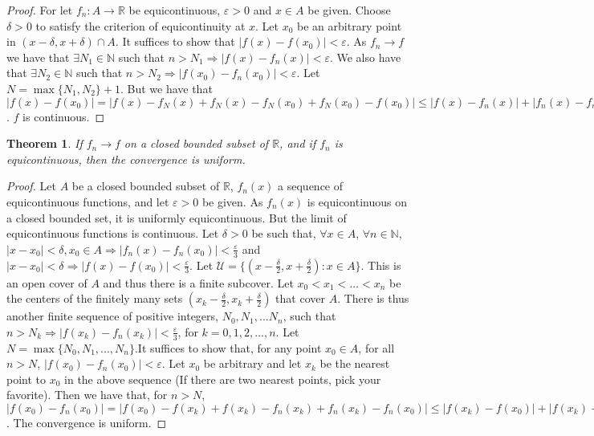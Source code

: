 \documentclass[crop=false,class=book]{standalone}
\theoremstyle{mystyle}
\newtheorem{theorem}{Theorem}[section]
\begin{document}
\begin{proof}
For let $f_n:A\rightarrow \mathbb{R}$ be equicontinuous, $\varepsilon>0$ and $x\in A$ be given. Choose $\delta>0$ to satisfy the criterion of equicontinuity at $x$. Let $x_0$ be an arbitrary point in $(x-\delta,x+\delta)\cap A$. It suffices to show that $|f(x) - f(x_0)|<\varepsilon$. As $f_n \rightarrow f$ we have that $\exists N_1 \in\mathbb{N}$ such that $n>N_1\Rightarrow |f(x) - f_n(x)|<\varepsilon$. We also have that $\exists N_2 \in \mathbb{N}$ such that $n>N_2 \Rightarrow |f(x_0)-f_n(x_0)|<\varepsilon$. Let $N=\max\{N_1,N_2\}+1$. But we have that $|f(x) - f(x_0)| = |f(x) - f_N(x) + f_N(x)-f_N(x_0) + f_N(x_0) - f(x_0)|\leq |f(x) - f_n(x)| + |f_n(x)-f_n(x_0)| + |f_n(x_0) - f(x_0)| < 3\varepsilon$. $f$ is continuous.
\end{proof}
\begin{theorem}
If $f_n \rightarrow f$ on a closed bounded subset of $\mathbb{R}$, and if $f_n$ is equicontinuous, then the convergence is uniform.
\end{theorem}
\begin{proof}
Let $A$ be a closed bounded subset of $\mathbb{R}$, $f_n(x)$ a sequence of equicontinuous functions, and let $\varepsilon>0$ be given. As $f_n(x)$ is equicontinuous on a closed bounded set, it is uniformly equicontinuous. But the limit of equicontinuous functions is continuous. Let $\delta>0$ be such that, $\forall x\in A$, $\forall n\in\mathbb{N}$, $|x-x_0|<\delta, x_0\in A \Rightarrow |f_n(x)-f_n(x_0)|<\frac{\varepsilon}{3}$ and $|x-x_0|<\delta \Rightarrow |f(x)-f(x_0)|<\frac{\varepsilon}{3}$. Let $\mathcal{U} = \{(x-\frac{\delta}{2},x+\frac{\delta}{2}): x\in A\}$. This is an open cover of $A$ and thus there is a finite subcover. Let $x_0<x_1<\hdots<x_n$ be the centers of the finitely many sets $(x_k-\frac{\delta}{2},x_k+\frac{\delta}{2})$ that cover $A$. There is thus another finite sequence of positive integers, $N_0, N_1,... N_n$, such that $n>N_k \Rightarrow |f(x_k)-f_n(x_k)|<\frac{\varepsilon}{3}$, for $k=0,1,2,...,n$. Let $N= \max\{N_0, N_1, ..., N_n\}$.It suffices to show that, for any point $x_0 \in A$, for all $n>N$, $|f(x_0)-f_n(x_0)|<\varepsilon$. Let $x_0$ be arbitrary and let $x_k$ be the nearest point to $x_0$ in the above sequence (If there are two nearest points, pick your favorite). Then we have that, for $n>N$, $|f(x_0) - f_n(x_0)| = |f(x_0)-f(x_k)+f(x_k)-f_n(x_k)+f_n(x_k)-f_n(x_0)|\leq |f(x_k)-f(x_0)|+|f(x_k)-f_n(x_k)|+|f_n(x_k)-f_n(x_0)|<\varepsilon$. The convergence is uniform.
\end{proof}
\end{document}
